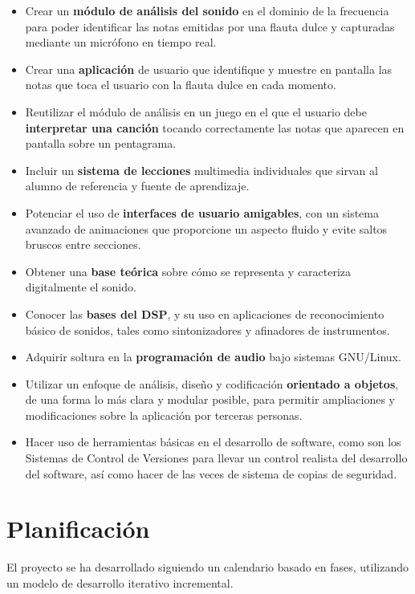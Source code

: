 \documentclass[a4paper,11pt]{article}
\begin{document}
\begin{itemize}
\item Crear un \textbf{módulo de análisis del sonido} en el dominio de la
  frecuencia para poder identificar las notas emitidas por una flauta dulce y
  capturadas mediante un micrófono en tiempo real.
\item Crear una \textbf{aplicación} de usuario que identifique y muestre en
  pantalla las notas que toca el usuario con la flauta dulce en cada momento.
\item Reutilizar el módulo de análisis en un juego en el que el usuario debe
  \textbf{ interpretar una canción} tocando correctamente las notas que aparecen
  en pantalla sobre un pentagrama.
\item Incluir un \textbf{sistema de lecciones} multimedia individuales que
  sirvan al alumno de referencia y fuente de aprendizaje.
\item Potenciar el uso de \textbf{interfaces de usuario amigables}, con un
  sistema avanzado de animaciones que proporcione un aspecto fluido y evite
  saltos bruscos entre secciones.
\item Obtener una \textbf{base teórica} sobre cómo se representa y caracteriza
  digitalmente el sonido.
\item Conocer las \textbf{bases del DSP}, y su uso en aplicaciones de
  reconocimiento básico de sonidos, tales como sintonizadores y afinadores de
  instrumentos.
\item Adquirir soltura en la \textbf{programación de audio} bajo sistemas
  GNU/Linux.
\item Utilizar un enfoque de análisis, diseño y codificación \textbf{orientado a
    objetos}, de una forma lo más clara y modular posible, para permitir
  ampliaciones y modificaciones sobre la aplicación por terceras personas.
\item Hacer uso de herramientas básicas en el desarrollo de software, como son
  los Sistemas de Control de Versiones para llevar un control realista del
  desarrollo del software, así como hacer de las veces de sistema de copias de
  seguridad.

\end{itemize}

\section{Planificación}
El proyecto se ha desarrollado siguiendo un calendario basado en fases,
utilizando un modelo de desarrollo iterativo incremental.
\end{document}
